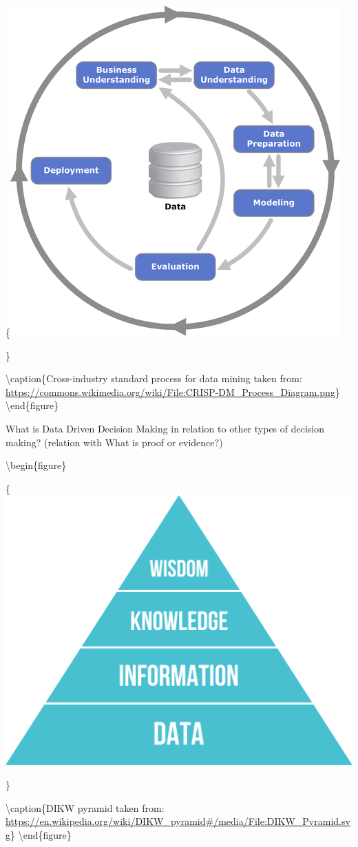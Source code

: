\documentclass[
]{book}
\begin{document}
\{\centering \includegraphics[width=0.8\linewidth]{images/crisp}

\}

\textbackslash caption\{Cross-industry standard process for data mining taken from: \url{https://commons.wikimedia.org/wiki/File:CRISP-DM_Process_Diagram.png}\}\label{fig:crisp-fig}
\textbackslash end\{figure\}

What is Data Driven Decision Making in relation to other types of decision making? (relation with What is proof or evidence?)

\textbackslash begin\{figure\}

\{\centering \includegraphics[width=0.8\linewidth]{images/pyramid}

\}

\textbackslash caption\{DIKW pyramid taken from: \url{https://en.wikipedia.org/wiki/DIKW_pyramid\#/media/File:DIKW_Pyramid.svg}\}\label{fig:dikw-fig}
\textbackslash end\{figure\}
\end{document}
